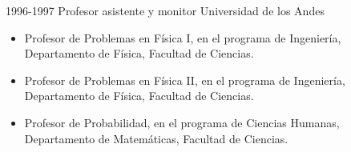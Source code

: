 \begin{entrylist}
  \entry
        {1996-1997}
	{Profesor asistente y monitor}
	{Universidad de los Andes}
	{\begin{itemize}
              \item Profesor de Problemas en Física I, en el programa de Ingeniería,
		      Departamento de Física, Facultad de Ciencias.
              \item Profesor de Problemas en Física II, en el programa de Ingeniería,
		      Departamento de Física, Facultad de Ciencias.
              \item Profesor de Probabilidad, en el programa de Ciencias Humanas, Departamento
		      de Matemáticas, Facultad de Ciencias.
	\end{itemize}}
\end{entrylist}
